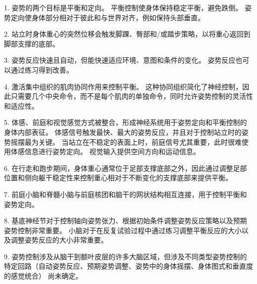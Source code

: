 1. 姿势的两个目标是平衡和定向。
平衡控制使身体保持稳定平衡，避免跌倒。
姿势定向使身体部分相对于彼此和与世界对齐，例如保持头部垂直。


2. 站立时身体重心的突然位移会触发脚踝、臀部和/或踏步策略，以将重心返回到脚部支撑的底部。


3. 姿势反应快速且自动，但能快速适应环境、意图和条件的变化。
姿势反应也可以通过练习得到改善。


4. 激活集中组织的肌肉协同作用来控制平衡。
这种协同组织简化了神经控制，因此只需要几个中央命令，而不是每个肌肉的单独命令，同时允许姿势控制的灵活性和适应性。


5. 体感、前庭和视觉感觉方式被整合，形成神经系统用于姿势定向和平衡控制的身体内部表征。
体感信号触发最快、最大的姿势反应，并且对于控制站立时的姿势摇摆最为关键。
当站立在不稳定的表面上时，前庭信号尤其重要，此时很难使用体感信息进行姿势定向。
视觉输入提供空间方向和运动信息。


6. 在行走和跑步期间，身体重心通常位于足部支撑底部之外，因此通过调整足部位置和侧向躯干稳定性来控制重心相对于不断变化的支撑底部来提供平衡。


7. 前庭小脑和脊髓小脑与前庭核团和脑干的网状结构相互连接，用于控制平衡和姿势定向。


8. 基底神经节对于控制轴向姿势张力、根据初始条件调整姿势反应策略以及预期姿势控制非常重要。
小脑对于在反复试验过程中通过练习调整平衡反应的大小以及调整姿势反应的大小非常重要。


9. 姿势控制涉及从脑干到额叶皮层的许多大脑区域，但涉及不同类型姿势控制的特定回路（自动姿势反应、预期姿势调整、姿势中的身体摇摆、身体图式和垂直度的感觉统合） 尚未确定。

